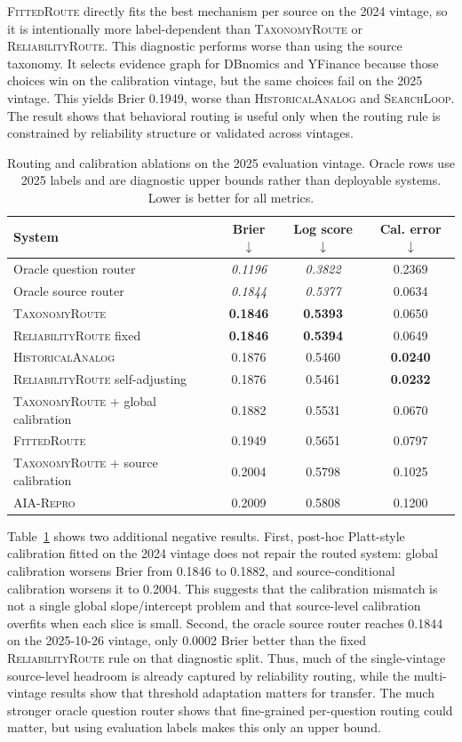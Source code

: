 \documentclass{article}
\newcommand{\tax}{\textsc{TaxonomyRoute}}
\newcommand{\rel}{\textsc{ReliabilityRoute}}
\newcommand{\fitroute}{\textsc{FittedRoute}}
\newcommand{\hist}{\textsc{HistoricalAnalog}}
\newcommand{\search}{\textsc{SearchLoop}}
\newcommand{\aialocal}{\textsc{AIA-Repro}}
\begin{document}
\fitroute{} directly fits the best mechanism per source on the 2024 vintage, so it is intentionally more label-dependent than \tax{} or \rel{}. This diagnostic performs worse than using the source taxonomy. It selects evidence graph for DBnomics and YFinance because those choices win on the calibration vintage, but the same choices fail on the 2025 vintage. This yields Brier 0.1949, worse than \hist{} and \search{}. The result shows that behavioral routing is useful only when the routing rule is constrained by reliability structure or validated across vintages.

\begin{table}[t]
\centering
\caption{Routing and calibration ablations on the 2025 evaluation vintage. Oracle rows use 2025 labels and are diagnostic upper bounds rather than deployable systems. Lower is better for all metrics.}
\label{tab:ablations}
\begin{tabular}{lccc}
\toprule
System & Brier $\downarrow$ & Log score $\downarrow$ & Cal. error $\downarrow$ \\
\midrule
Oracle question router & \textit{0.1196} & \textit{0.3822} & 0.2369 \\
Oracle source router & \textit{0.1844} & \textit{0.5377} & 0.0634 \\
\tax{} & \textbf{0.1846} & \textbf{0.5393} & 0.0650 \\
\rel{} fixed & \textbf{0.1846} & \textbf{0.5394} & 0.0649 \\
\hist{} & 0.1876 & 0.5460 & \textbf{0.0240} \\
\rel{} self-adjusting & 0.1876 & 0.5461 & \textbf{0.0232} \\
\tax{} + global calibration & 0.1882 & 0.5531 & 0.0670 \\
\fitroute{} & 0.1949 & 0.5651 & 0.0797 \\
\tax{} + source calibration & 0.2004 & 0.5798 & 0.1025 \\
\aialocal{} & 0.2009 & 0.5808 & 0.1200 \\
\bottomrule
\end{tabular}
\end{table}

Table~\ref{tab:ablations} shows two additional negative results. First, post-hoc Platt-style calibration fitted on the 2024 vintage does not repair the routed system: global calibration worsens Brier from 0.1846 to 0.1882, and source-conditional calibration worsens it to 0.2004. This suggests that the calibration mismatch is not a single global slope/intercept problem and that source-level calibration overfits when each slice is small. Second, the oracle source router reaches 0.1844 on the 2025-10-26 vintage, only 0.0002 Brier better than the fixed \rel{} rule on that diagnostic split. Thus, much of the single-vintage source-level headroom is already captured by reliability routing, while the multi-vintage results show that threshold adaptation matters for transfer. The much stronger oracle question router shows that fine-grained per-question routing could matter, but using evaluation labels makes this only an upper bound.
\end{document}
